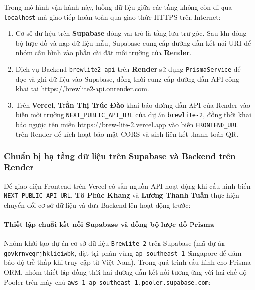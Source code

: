 Trong mô hình vận hành này, luồng dữ liệu giữa các tầng không còn đi qua \texttt{localhost} mà giao tiếp hoàn toàn qua giao thức HTTPS trên Internet:
\begin{enumerate}
    \item Cơ sở dữ liệu trên \textbf{Supabase} đóng vai trò là tầng lưu trữ gốc. Sau khi đồng bộ lược đồ và nạp dữ liệu mẫu, Supabase cung cấp đường dẫn kết nối URI để nhóm cấu hình vào phần cài đặt môi trường của \textbf{Render}.
    \item Dịch vụ Backend \texttt{brewlite2-api} trên \textbf{Render} sử dụng \texttt{PrismaService} để đọc và ghi dữ liệu vào Supabase, đồng thời cung cấp đường dẫn API công khai tại \url{https://brewlite2-api.onrender.com}.
    \item Trên \textbf{Vercel}, \textbf{Trần Thị Trúc Đào} khai báo đường dẫn API của Render vào biến môi trường \texttt{NEXT\_PUBLIC\_API\_URL} của dự án \texttt{brewlite-2}, đồng thời khai báo ngược tên miền \url{https://brew-lite-2.vercel.app} vào biến \texttt{FRONTEND\_URL} trên Render để kích hoạt bảo mật CORS và sinh liên kết thanh toán QR.
\end{enumerate}

\subsubsection{Chuẩn bị hạ tầng dữ liệu trên Supabase và Backend trên Render}
Để giao diện Frontend trên Vercel có sẵn nguồn API hoạt động khi cấu hình biến \texttt{NEXT\_PUBLIC\_API\_URL}, \textbf{Tô Phúc Khang} và \textbf{Lương Thanh Tuấn} thực hiện chuyển đổi cơ sở dữ liệu và đưa Backend lên hoạt động trước:

\paragraph{Thiết lập chuỗi kết nối Supabase và đồng bộ lược đồ Prisma}
Nhóm khởi tạo dự án cơ sở dữ liệu \texttt{BrewLite-2} trên Supabase (mã dự án \texttt{govkrnveqrjhklieiwbk}, đặt tại phân vùng \texttt{ap-southeast-1} Singapore để đảm bảo độ trễ thấp khi truy cập từ Việt Nam). Trong quá trình cấu hình cho Prisma ORM, nhóm thiết lập đồng thời hai đường dẫn kết nối tương ứng với hai chế độ Pooler trên máy chủ \texttt{aws-1-ap-southeast-1.pooler.supabase.com}:

